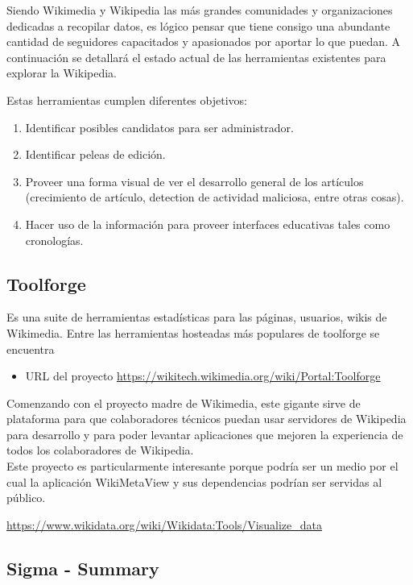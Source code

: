 Siendo Wikimedia y Wikipedia las más grandes comunidades y organizaciones dedicadas a recopilar datos, es lógico pensar que tiene consigo una abundante cantidad de seguidores capacitados y apasionados por aportar lo que puedan. A continuación se detallará el estado actual de las herramientas existentes para explorar la Wikipedia.

Estas herramientas cumplen diferentes objetivos:

\begin{enumerate}
    \item Identificar posibles candidatos para ser administrador.
    \item Identificar peleas de edición.
    \item Proveer una forma visual de ver el desarrollo general de los artículos (crecimiento de artículo, detection de actividad maliciosa, entre otras cosas).
    \item Hacer uso de la información para proveer interfaces educativas tales como cronologías.
\end{enumerate}


\subsection{Toolforge}

Es una suite de herramientas estadísticas para las páginas, usuarios, wikis de Wikimedia. Entre las herramientas hosteadas más populares de toolforge se encuentra 

\begin{itemize}
    \item URL del proyecto \url{https://wikitech.wikimedia.org/wiki/Portal:Toolforge}
\end{itemize}

Comenzando con el proyecto madre de Wikimedia, este gigante sirve de plataforma para que colaboradores técnicos puedan usar servidores de Wikipedia para desarrollo y para poder levantar aplicaciones que mejoren la experiencia de todos los colaboradores de Wikipedia.
\\
Este proyecto es particularmente interesante porque podría ser un medio por el cual la aplicación WikiMetaView y sus dependencias podrían ser servidas al público.

\url{https://www.wikidata.org/wiki/Wikidata:Tools/Visualize_data}

\subsection{Sigma - Summary}

